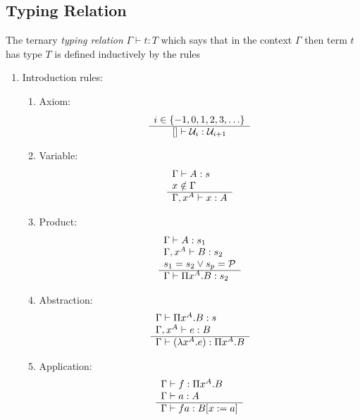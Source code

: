 \subsection{Typing Relation}


\begin{definition}
    The ternary \emph{typing relation} $\Gamma \vdash t: T$ which says that in
    the context $\Gamma$ then term $t$ has type $T$ is defined inductively by
    the rules
    \begin{enumerate}
    \item Introduction rules:
        \begin{enumerate}
            \item Axiom:
                $$
                \begin{array}{c} i \in \{-1, 0, 1, 2, 3, \ldots \} \\ \hline  [] \vdash {\cal U}_i : {\cal U}_{i + 1}\end{array}
                $$

        \item Variable:
            $$
            \begin{array}{l} 
                \Gamma \vdash A: s
                \\
                x \notin \Gamma
             \\ \hline 
                \Gamma, x^A \vdash x: A
            \end{array}
            $$

        \item Product:
            $$
            \begin{array}{l} 
                \Gamma \vdash A: s_1
                \\
                \Gamma, x^A \vdash B: s_2
                \\
                s_1 = s_2 \lor s_p = {\cal P}
             \\ \hline 
                \Gamma \vdash \Pi x^A.B : s_2
            \end{array}
            $$

        \item Abstraction:
            $$
            \begin{array}{l} 
                \Gamma \vdash \Pi x^A. B: s
                \\
                \Gamma, x^A \vdash e: B
             \\ \hline 
                \Gamma \vdash (\lambda x^A. e): \Pi x^A. B
            \end{array}
            $$

        \item Application:
            $$
            \begin{array}{l} 
                \Gamma \vdash f: \Pi x^A. B
                \\
                \Gamma \vdash a: A
             \\ \hline 
                \Gamma \vdash f a: B[x:=a]
            \end{array}
            $$
        \end{enumerate}



\end{enumerate}
\end{definition}
